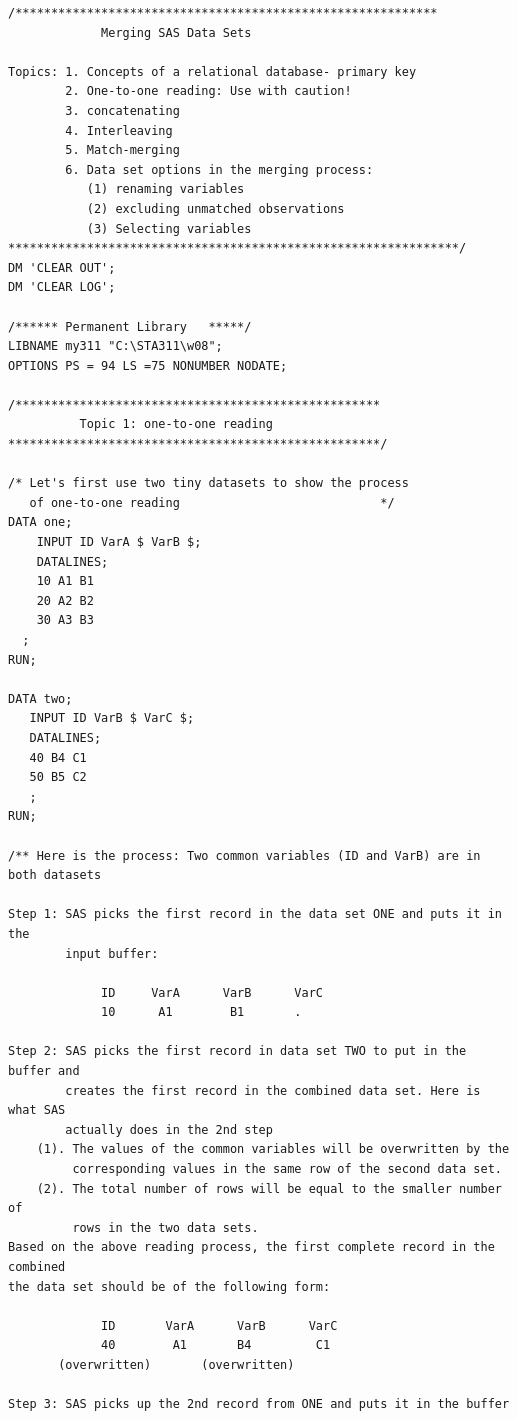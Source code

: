 \documentclass[
]{book}
\begin{document}
\begin{verbatim}
/***********************************************************
             Merging SAS Data Sets

Topics: 1. Concepts of a relational database- primary key
        2. One-to-one reading: Use with caution!
        3. concatenating
        4. Interleaving
        5. Match-merging
        6. Data set options in the merging process: 
           (1) renaming variables
           (2) excluding unmatched observations
           (3) Selecting variables
***************************************************************/
DM 'CLEAR OUT';
DM 'CLEAR LOG';

/****** Permanent Library   *****/
LIBNAME my311 "C:\STA311\w08";
OPTIONS PS = 94 LS =75 NONUMBER NODATE;

/***************************************************
          Topic 1: one-to-one reading
****************************************************/

/* Let's first use two tiny datasets to show the process
   of one-to-one reading                            */
DATA one;
    INPUT ID VarA $ VarB $;
    DATALINES;
    10 A1 B1
    20 A2 B2
    30 A3 B3
  ;
RUN;

DATA two;
   INPUT ID VarB $ VarC $;
   DATALINES;
   40 B4 C1
   50 B5 C2
   ;
RUN;

/** Here is the process: Two common variables (ID and VarB) are in both datasets 

Step 1: SAS picks the first record in the data set ONE and puts it in the 
        input buffer:

             ID     VarA      VarB      VarC
             10      A1        B1       .

Step 2: SAS picks the first record in data set TWO to put in the buffer and 
        creates the first record in the combined data set. Here is what SAS 
        actually does in the 2nd step
    (1). The values of the common variables will be overwritten by the 
         corresponding values in the same row of the second data set.
    (2). The total number of rows will be equal to the smaller number of 
         rows in the two data sets.
Based on the above reading process, the first complete record in the combined 
the data set should be of the following form:

             ID       VarA      VarB      VarC 
             40        A1       B4         C1
       (overwritten)       (overwritten)

Step 3: SAS picks up the 2nd record from ONE and puts it in the buffer
             

\end{verbatim}
\end{document}
